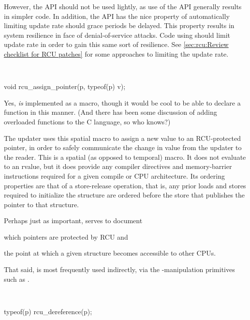 \begin{description}
	However, the  API should not be used lightly, as use
	of the  API generally results in simpler code.
	In addition, the  API has the nice property
	of automatically limiting update rate should grace periods
	be delayed.
	This property results in system resilience in face
	of denial-of-service attacks.
	Code using  should limit
	update rate in order to gain this same sort of resilience.
	See \cref{sec:rcu:Review checklist for RCU patches}
	for some approaches to limiting the update rate.

\item[\tco{rcu_assign_pointer()}] {~}

\begin{VerbatimU}
	void rcu_assign_pointer(p, typeof(p) v);
\end{VerbatimU}

	Yes,  \emph{is} implemented as a macro, though
	it would be cool to be able to declare a function in this manner.
	(And there has been some discussion of adding overloaded functions
	to the C language, so who knows?)

	The updater uses this spatial macro to assign a new value to an
	RCU-protected pointer, in order to safely communicate the change
	in value from the updater to the reader.
	This is a spatial (as
	opposed to temporal) macro.
	It does not evaluate to an rvalue,
	but it does provide any compiler directives and memory-barrier
	instructions required for a given compile or CPU architecture.
	Its ordering properties are that of a store-release operation,
	that is, any prior loads and stores required to initialize the
	structure are ordered before the store that publishes the pointer
	to that structure.

	Perhaps just as important,  serves to document
	\begin{enumerate*}[(1)]
	\item which pointers are protected by RCU and
	\item the point at which
	a given structure becomes accessible to other CPUs.
	\end{enumerate*}
	That said,
	 is most frequently used indirectly, via
	the -manipulation primitives such as .

\item[\tco{rcu_dereference()}] {~}

\begin{VerbatimU}
	typeof(p) rcu_dereference(p);
\end{VerbatimU}


\end{description}
